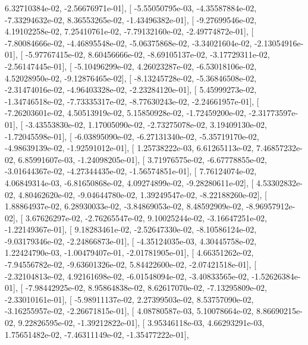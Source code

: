 \documentclass{article}
\begin{document}
          6.32710384e-02,  -2.56676971e-01],
       [ -5.55050795e-03,  -4.35587884e-02,  -7.33294632e-02,
          8.36553265e-02,  -1.43496382e-01],
       [ -9.27699546e-02,   4.19102258e-02,   7.25410761e-02,
         -7.79132160e-02,  -2.49774872e-01],
       [ -7.80084666e-02,  -4.46895548e-02,  -5.06375868e-02,
         -3.34021604e-02,  -2.13054916e-01],
       [ -5.97767415e-02,   8.60456666e-02,  -8.69105137e-02,
         -3.17729311e-02,  -2.56147445e-01],
       [ -5.10496299e-02,   4.26023287e-02,  -6.53018106e-02,
          4.52028950e-02,  -9.12876465e-02],
       [ -8.13245728e-02,  -5.36846508e-02,  -2.31474016e-02,
         -4.96403328e-02,  -2.23284120e-01],
       [  5.45999273e-02,  -1.34746518e-02,  -7.73335317e-02,
         -8.77630243e-02,  -2.24661957e-01],
       [ -7.26203601e-02,   4.50513919e-02,   5.15850928e-02,
         -1.72459200e-02,  -2.31773597e-01],
       [ -3.43553830e-02,   1.17005090e-02,  -2.73275078e-02,
          3.19409130e-02,  -1.72045598e-01],
       [ -6.03895090e-02,  -6.27131340e-02,  -5.35719170e-02,
         -4.98639139e-02,  -1.92591012e-01],
       [  1.25738222e-03,   6.61265113e-02,   7.46857232e-02,
          6.85991607e-03,  -1.24098205e-01],
       [  3.71976575e-02,  -6.67778855e-02,  -3.01644367e-02,
         -4.27344435e-02,  -1.56574851e-01],
       [  7.76124074e-02,   4.06849314e-03,  -6.81650868e-02,
          4.09274899e-02,  -9.28280611e-02],
       [  4.53302832e-02,   4.80462620e-02,  -9.04644780e-02,
          1.39249547e-02,  -8.22188260e-02],
       [  1.88864937e-02,   6.28930033e-02,  -3.84869053e-02,
          8.48592909e-02,  -8.96957912e-02],
       [  3.67626297e-02,  -2.76265547e-02,   9.10025244e-02,
         -3.16647251e-02,  -1.22149367e-01],
       [  9.18283461e-02,  -2.52647330e-02,  -8.10586124e-02,
         -9.03179346e-02,  -2.24866873e-01],
       [ -4.35124035e-03,   4.30445758e-02,   1.22424790e-03,
         -1.00479407e-01,  -2.01781905e-01],
       [  4.66351262e-02,  -7.94556782e-02,  -9.63601326e-02,
          5.84422600e-02,  -2.07421518e-01],
       [ -2.32104813e-02,   4.92161698e-02,  -6.01548094e-02,
         -3.40833565e-02,  -1.52626384e-01],
       [ -7.98442925e-02,   8.95864838e-02,   8.62617070e-02,
         -7.13295809e-02,  -2.33010161e-01],
       [ -5.98911137e-02,   2.27399503e-02,   8.53757090e-02,
         -3.16255957e-02,  -2.26671815e-01],
       [  4.08780587e-03,   5.10078664e-02,   8.86690215e-02,
          9.22826595e-02,  -1.39212822e-01],
       [  3.95346118e-03,   4.66293291e-03,   1.75651482e-02,
         -7.46311149e-02,  -1.35477222e-01],
\end{document}
